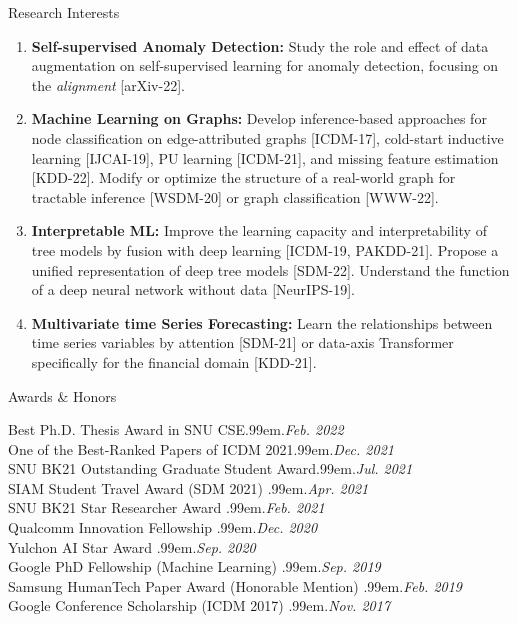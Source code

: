 \documentclass{resume} %
\makeatletter
\newcommand \Dotfill {\leavevmode \cleaders \hb@xt@ .99em{\hss .\hss }\hfill \kern \z@}
\makeatother
\begin{document}
\begin{rSection}{Research Interests}

\begin{enumerate}[noitemsep, leftmargin=*]
	\item \textbf{Self-supervised Anomaly Detection:} Study the role and effect of data augmentation on self-supervised learning for anomaly detection, focusing on the \emph{alignment} [arXiv-22]. \medskip
	\item \textbf{Machine Learning on Graphs:} Develop inference-based approaches for node classification on edge-attributed graphs [ICDM-17], cold-start inductive learning [IJCAI-19], PU learning [ICDM-21], and missing feature estimation [KDD-22].
	Modify or optimize the structure of a real-world graph for tractable inference [WSDM-20] or graph classification [WWW-22]. \medskip
	\item \textbf{Interpretable ML:} Improve the learning capacity and interpretability of tree models by fusion with deep learning [ICDM-19, PAKDD-21].
	Propose a unified representation of deep tree models [SDM-22].
	Understand the function of a deep neural network without data [NeurIPS-19]. \medskip
	\item \textbf{Multivariate time Series Forecasting:} Learn the relationships between time series variables by attention [SDM-21] or data-axis Transformer specifically for the financial domain [KDD-21].
\end{enumerate}

\end{rSection}


\begin{rSection}{Awards \& Honors}

Best Ph.D. Thesis Award in SNU CSE\smallskip \Dotfill \emph{Feb. 2022} \\ 
One of the Best-Ranked Papers of ICDM 2021\smallskip \Dotfill \emph{Dec. 2021} \\ 
SNU BK21 Outstanding Graduate Student Award\smallskip \Dotfill \emph{Jul. 2021} \\ 
SIAM Student Travel Award (SDM 2021) \smallskip \Dotfill \emph{Apr. 2021} \\ 
SNU BK21 Star Researcher Award \smallskip \Dotfill \emph{Feb. 2021} \\ 
Qualcomm Innovation Fellowship \smallskip \Dotfill \emph{Dec. 2020} \\ 
Yulchon AI Star Award \smallskip \Dotfill \emph{Sep. 2020} \\ 
Google PhD Fellowship (Machine Learning) \smallskip \Dotfill \emph{Sep. 2019} \\ 
Samsung HumanTech Paper Award (Honorable Mention) \smallskip \Dotfill \emph{Feb. 2019} \\ 
Google Conference Scholarship (ICDM 2017) \smallskip \Dotfill \emph{Nov. 2017} \\ 

\end{rSection}
\newpage
\end{document}
